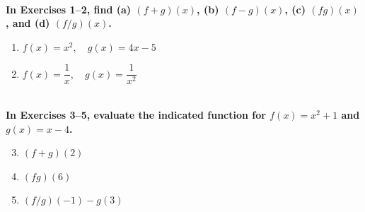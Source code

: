 \begin{exercise}
    ~\\\-\hspace{0.3cm} \textbf{
        In Exercises 1–2, find (a) $(f+g)(x)$, (b) $(f-g)(x)$, (c) $(fg)(x)$, and (d) $(f/g)(x)$.
    }\cite{ci}\\
    \begin{enumerate} 
		\item $f(x) = x^2,\quad g(x)=4x-5$
		\item $f(x) = \dfrac{1}{x},\quad g(x)=\dfrac{1}{x^2}$
    \end{enumerate}
    ~\\\-\hspace{0.3cm} \textbf{
        In Exercises 3–5, evaluate the indicated function for
        $f(x)=x^2+1$ and $g(x)=x-4$.
    }\cite{ci}\\
    \begin{enumerate}
        \setcounter{enumi}{2}
        \item $(f+g)(2)$
        \item $(fg)(6)$
        \item $(f/g)(-1)-g(3)$
    \end{enumerate}
\end{exercise}
